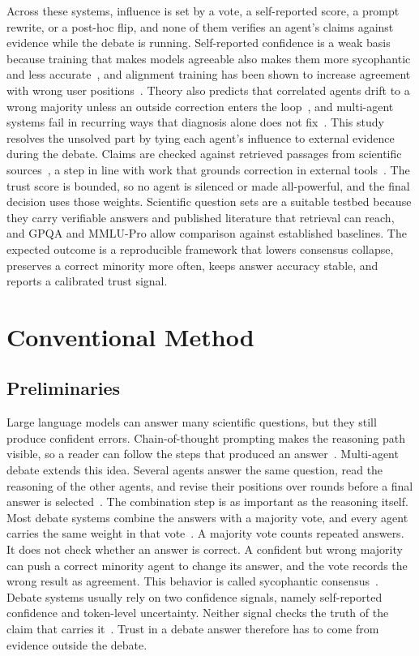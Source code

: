 \documentclass[a4paper,fleqn]{cas-sc}
\begin{document}
Across these systems, influence is set by a vote, a self-reported score, a prompt rewrite, or a post-hoc flip, and none of them verifies an agent's claims against evidence while the debate is running. Self-reported confidence is a weak basis because training that makes models agreeable also makes them more sycophantic and less accurate~\cite{ibrahim2026training}, and alignment training has been shown to increase agreement with wrong user positions~\cite{chen2025self}. Theory also predicts that correlated agents drift to a wrong majority unless an outside correction enters the loop~\cite{estornell2024multillm}, and multi-agent systems fail in recurring ways that diagnosis alone does not fix~\cite{cemri2025why}. This study resolves the unsolved part by tying each agent's influence to external evidence during the debate. Claims are checked against retrieved passages from scientific sources~\cite{karpukhin2020dense,kushwaha2026agentbased}, a step in line with work that grounds correction in external tools~\cite{gou2024critic}. The trust score is bounded, so no agent is silenced or made all-powerful, and the final decision uses those weights. Scientific question sets are a suitable testbed because they carry verifiable answers and published literature that retrieval can reach, and GPQA and MMLU-Pro allow comparison against established baselines. The expected outcome is a reproducible framework that lowers consensus collapse, preserves a correct minority more often, keeps answer accuracy stable, and reports a calibrated trust signal.

\section{Conventional Method}\label{sec2}

\subsection{Preliminaries}
Large language models can answer many scientific questions, but they still produce confident errors. Chain-of-thought prompting makes the reasoning path visible, so a reader can follow the steps that produced an answer~\cite{wei2022chain,zhang2025from}. Multi-agent debate extends this idea. Several agents answer the same question, read the reasoning of the other agents, and revise their positions over rounds before a final answer is selected~\cite{du2024improving}. The combination step is as important as the reasoning itself. Most debate systems combine the answers with a majority vote, and every agent carries the same weight in that vote~\cite{wang-etal-2024-rethinking-bounds}. A majority vote counts repeated answers. It does not check whether an answer is correct. A confident but wrong majority can push a correct minority agent to change its answer, and the vote records the wrong result as agreement. This behavior is called sycophantic consensus~\cite{pitre-etal-2025-consensagent}. Debate systems usually rely on two confidence signals, namely self-reported confidence and token-level uncertainty. Neither signal checks the truth of the claim that carries it~\cite{yoffe-etal-2025-debunc}. Trust in a debate answer therefore has to come from evidence outside the debate.
\end{document}

